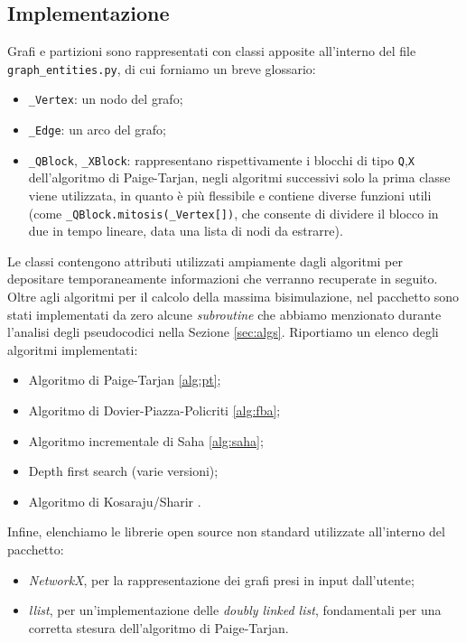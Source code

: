 \subsection{Implementazione}
Grafi e partizioni sono rappresentati con classi apposite all'interno del file \verb|graph_entities.py|, di cui forniamo un breve glossario:
\begin{itemize}
    \item \verb|_Vertex|: un nodo del grafo;
    \item \verb|_Edge|: un arco del grafo;
    \item \verb|_QBlock|, \verb|_XBlock|: rappresentano rispettivamente i blocchi di tipo \verb|Q|,\verb|X| dell'algoritmo di Paige-Tarjan, negli algoritmi successivi solo la prima classe viene utilizzata, in quanto è più flessibile e contiene diverse funzioni utili (come \verb|_QBlock.mitosis(_Vertex[])|, che consente di dividere il blocco in due in tempo lineare, data una lista di nodi da estrarre).
\end{itemize}
Le classi contengono attributi utilizzati ampiamente dagli algoritmi per depositare temporaneamente informazioni che verranno recuperate in seguito. Oltre agli algoritmi per il calcolo della massima bisimulazione, nel pacchetto sono stati implementati da zero alcune \emph{subroutine} che abbiamo menzionato durante l'analisi degli pseudocodici nella Sezione \ref{sec:algs}. Riportiamo un elenco degli algoritmi implementati:
\begin{itemize}
    \item Algoritmo di Paige-Tarjan \ref{alg:pt};
    \item Algoritmo di Dovier-Piazza-Policriti \ref{alg:fba};
    \item Algoritmo incrementale di Saha \ref{alg:saha};
    \item Depth first search (varie versioni);
    \item Algoritmo di Kosaraju/Sharir \cite{sharir}.
\end{itemize}

Infine, elenchiamo le librerie open source non standard utilizzate all'interno del pacchetto:
\begin{itemize}
    \item \emph{NetworkX}, per la rappresentazione dei grafi presi in input dall'utente;
    \item \emph{llist}, per un'implementazione delle \emph{doubly linked list}, fondamentali per una corretta stesura dell'algoritmo di Paige-Tarjan.
\end{itemize}
